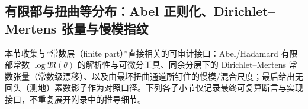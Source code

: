 \subsection{有限部与扭曲等分布：Abel 正则化、Dirichlet--Mertens 张量与慢模指纹}\label{subsec:zeta-finite-part-finite-constant}
本节收集与“常数层（finite part）”直接相关的可审计接口：Abel/Hadamard 有限部常数 \(\log\mathfrak{M}(\theta)\) 的解析性与可微分工具、同余分层下的 Dirichlet--Mertens 常数张量（常数级漂移）、以及由最坏扭曲通道所钉住的慢模/混合尺度；最后给出无回头（测地）素数影子作为对照口径。下列各子小节仅记录最终可复算断言与实现接口，不重复展开附录中的推导细节。












